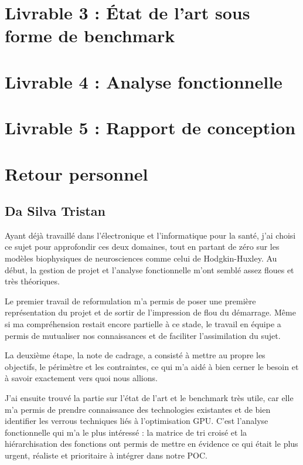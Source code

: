 \documentclass{report}
\begin{document}
\part{Livrable 3 : État de l'art sous forme de benchmark}
\label{part:l3}


\part{Livrable 4 : Analyse fonctionnelle}
\label{part:l4}


\part{Livrable 5 : Rapport de conception}
\label{part:l5}




\part{Retour personnel}
\label{part:rex}

\chapter{Da Silva Tristan}
Ayant déjà travaillé dans l'électronique et l'informatique pour la santé, j’ai choisi ce sujet pour approfondir ces deux domaines, tout en partant de zéro sur les modèles biophysiques de neurosciences comme celui de Hodgkin-Huxley. Au début, la gestion de projet et l'analyse fonctionnelle m’ont semblé assez floues et très théoriques.

Le premier travail de reformulation m'a permis de poser une première représentation du projet et de sortir de l'impression de flou du démarrage. Même si ma compréhension restait encore partielle à ce stade, le travail en équipe a permis de mutualiser nos connaissances et de faciliter l'assimilation du sujet.

La deuxième étape, la note de cadrage, a consisté à mettre au propre les objectifs, le périmètre et les contraintes, ce qui m'a aidé à bien cerner le besoin et à savoir exactement vers quoi nous allions.

J'ai ensuite trouvé la partie sur l'état de l'art et le benchmark très utile, car elle m'a permis de prendre connaissance des technologies existantes et de bien identifier les verrous techniques liés à l'optimisation GPU. C'est l'analyse fonctionnelle qui m'a le plus intéressé : la matrice de tri croisé et la hiérarchisation des fonctions ont permis de mettre en évidence ce qui était le plus urgent, réaliste et prioritaire à intégrer dans notre POC.
\end{document}
